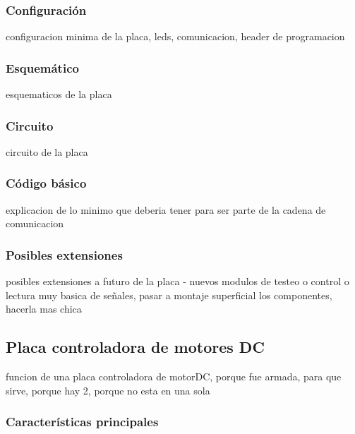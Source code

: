 \subsubsection{Configuraci\'on}
\label{h_placas_generica_config}

configuracion minima de la placa, leds, comunicacion, header de programacion

\subsubsection{Esquem\'atico}
\label{h_placas_generica_esquematicos}

esquematicos de la placa

\subsubsection{Circuito}
\label{h_placas_generica_circuito}

circuito de la placa

\subsubsection{C\'odigo b\'asico}
\label{h_placas_generica_codigo}

explicacion de lo minimo que deberia tener para ser parte de la cadena de comunicacion

\subsubsection{Posibles extensiones}
\label{h_placas_generica_extensiones}

posibles extensiones a futuro de la placa - nuevos modulos de testeo o control o lectura muy basica de señales, pasar a montaje superficial los componentes, hacerla mas chica

\subsection{Placa controladora de motores DC}
\label{h_placas_motorDC}

funcion de una placa controladora de motorDC, porque fue armada, para que sirve, porque hay 2, porque no esta en una sola

\subsubsection{Caracter\'isticas principales}
\label{h_placas_motorDC_caracteristicas}

